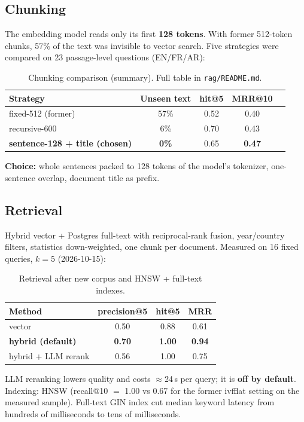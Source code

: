 \documentclass[11pt,a4paper]{article}
\begin{document}
\subsection{Chunking}
The embedding model reads only its first \textbf{128 tokens}. With former 512-token chunks, 57\% of the text was invisible to vector search. Five strategies were compared on 23 passage-level questions (EN/FR/AR):

\begin{table}[h]
\centering
\small
\begin{tabular}{lcccc}
\toprule
Strategy & Unseen text & hit@5 & MRR@10 \\
\midrule
fixed-512 (former) & 57\% & 0.52 & 0.40 \\
recursive-600 & 6\% & 0.70 & 0.43 \\
\textbf{sentence-128 + title (chosen)} & \textbf{0\%} & 0.65 & \textbf{0.47} \\
\bottomrule
\end{tabular}
\caption{Chunking comparison (summary). Full table in \texttt{rag/README.md}.}
\end{table}

\noindent\textbf{Choice:} whole sentences packed to 128 tokens of the model's tokenizer, one-sentence overlap, document title as prefix.

\subsection{Retrieval}
Hybrid vector + Postgres full-text with reciprocal-rank fusion, year/country filters, statistics down-weighted, one chunk per document. Measured on 16 fixed queries, $k{=}5$ (2026-10-15):

\begin{table}[h]
\centering
\small
\begin{tabular}{lccc}
\toprule
Method & precision@5 & hit@5 & MRR \\
\midrule
vector & 0.50 & 0.88 & 0.61 \\
\textbf{hybrid (default)} & \textbf{0.70} & \textbf{1.00} & \textbf{0.94} \\
hybrid + LLM rerank & 0.56 & 1.00 & 0.75 \\
\bottomrule
\end{tabular}
\caption{Retrieval after new corpus and HNSW + full-text indexes.}
\end{table}

\noindent LLM reranking lowers quality and costs $\approx$24\,s per query; it is \textbf{off by default}. Indexing: HNSW (recall@10 $=$ 1.00 vs 0.67 for the former ivfflat setting on the measured sample). Full-text GIN index cut median keyword latency from hundreds of milliseconds to tens of milliseconds.
\end{document}

